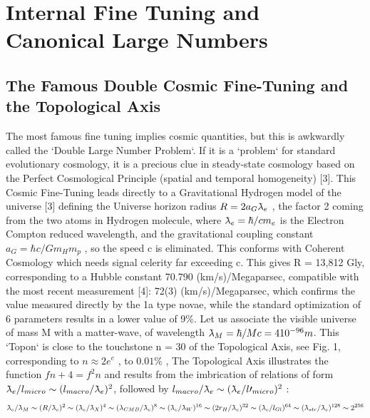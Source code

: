 
\chapter{Internal Fine Tuning and Canonical Large Numbers}
\label{chap:chapter_1}


\section{The Famous Double Cosmic Fine-Tuning and the Topological Axis}
\label{sec:examples}

The most famous fine tuning implies cosmic quantities, but this is awkwardly called the `Double
Large Number Problem`. If it is a `problem` for standard evolutionary cosmology, it is a precious
clue in steady-state cosmology based on the Perfect Cosmological Principle (spatial and temporal
homogeneity) [3].
This Cosmic Fine-Tuning leads directly to a Gravitational Hydrogen model of the universe [3]
defining the Universe horizon radius $R = 2a_{G} \lambdabar_{e}$ , the factor 2 coming from the two atoms in
Hydrogen molecule, where $\lambdabar_{e} = \hbar/cm_{e}$ is the Electron Compton reduced wavelength, and the
gravitational coupling constant $a_{G} = \hbar c/Gm_{H} m_{p}$ , so the speed c is eliminated. This conforms with
Coherent Cosmology which needs signal celerity far exceeding c. This gives R = 13,812 Gly, corresponding to a Hubble constant 70.790 (km/s)/Megaparsec, compatible with the
most recent measurement [4]: 72(3) (km/s)/Megaparsec, which confirms the value measured
directly by the 1a type novae, while the standard optimization of 6 parameters results in a lower
value of 9\%.
Let us associate the visible universe of mass M with a matter-wave, of wavelength $\lambdabar_{M} = \hbar /Mc = 4
10^{-96} m$. This `Topon` is close to the touchstone n = 30 of the Topological Axis, see Fig. 1,
corresponding to $n \approx 2e^{e}$ , to $0.01\%$ , The Topological Axis illustrates the function $f{n + 4} = f^{2}{n}$
and results from the imbrication of relations of form $\lambdabar_{e} /l_{micro} \sim (l_{macro} /\lambdabar_e )^{2} $, followed by $l_{macro} /\lambdabar_{e} \sim
(\lambdabar_{e} /l\prime_{micro} )^{2}$ :
$$\lambdabar_{e} /\lambdabar_{M} \sim (R/ \lambdabar_{e} )^{2} \sim ( \lambdabar_e / \lambdabar_X )^{4} \sim (\lambda_ {CMB} / \lambdabar_e )^{8} \sim ( \lambdabar_{e} / \lambdabar_{W} )^{16} \sim (2r_{H} / \lambdabar_{e} )^{32} \sim ( \lambdabar_{e} / l_{Gl} )^{64} \sim ( \lambdabar_{str} / \lambdabar_{e} )^{128} \sim 2^{256}$$
